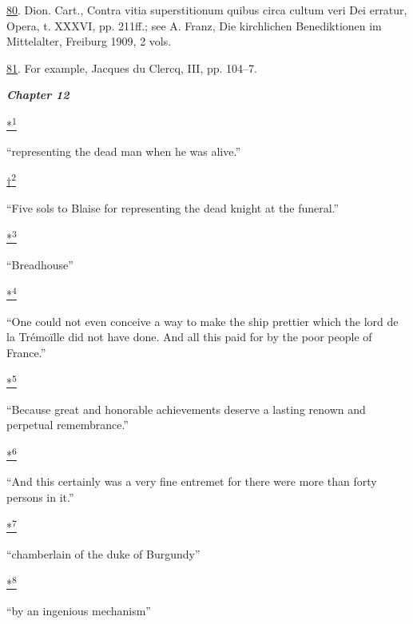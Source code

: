 \protect\hypertarget{23_NOTES.xhtmlux5cux23id_475}{\protect\hyperlink{18_Chapter_Eleven__THE_FORMS_OF_THO.xhtmlux5cux23id_474}{80}}.
Dion. Cart., Contra vitia superstitionum quibus circa cultum veri Dei
erratur, Opera, t. XXXVI, pp. 211ff.; see A. Franz, Die kirchlichen
Benediktionen im Mittelalter, Freiburg 1909, 2 vols.

\protect\hypertarget{23_NOTES.xhtmlux5cux23id_473}{\protect\hyperlink{18_Chapter_Eleven__THE_FORMS_OF_THO.xhtmlux5cux23id_472}{81}}.
For example, Jacques du Clercq, III, pp. 104--7.

\textbf{\emph{Chapter 12}}

\protect\hypertarget{23_NOTES.xhtmlux5cux23id_2656}{\protect\hyperlink{20_ILLUSTRATIONS_FOLLOW_PAGE.xhtmlux5cux23id_2655}{*\textsuperscript{1}}}
``representing the dead man when he was alive.''

\protect\hypertarget{23_NOTES.xhtmlux5cux23id_2658}{\protect\hyperlink{20_ILLUSTRATIONS_FOLLOW_PAGE.xhtmlux5cux23id_2657}{†\textsuperscript{2}}}
``Five sols to Blaise for representing the dead knight at the funeral.''

\protect\hypertarget{23_NOTES.xhtmlux5cux23id_2660}{\protect\hyperlink{20_ILLUSTRATIONS_FOLLOW_PAGE.xhtmlux5cux23id_2659}{*\textsuperscript{3}}}
``Breadhouse''

\protect\hypertarget{23_NOTES.xhtmlux5cux23id_2662}{\protect\hyperlink{20_ILLUSTRATIONS_FOLLOW_PAGE.xhtmlux5cux23id_2661}{*\textsuperscript{4}}}
``One could not even conceive a way to make the ship prettier which the
lord de la Trémoïlle did not have done. And all this paid for by the
poor people of France.''

\protect\hypertarget{23_NOTES.xhtmlux5cux23id_2664}{\protect\hyperlink{20_ILLUSTRATIONS_FOLLOW_PAGE.xhtmlux5cux23id_2663}{*\textsuperscript{5}}}
``Because great and honorable achievements deserve a lasting renown and
perpetual remembrance.''

\protect\hypertarget{23_NOTES.xhtmlux5cux23id_2666}{\protect\hyperlink{20_ILLUSTRATIONS_FOLLOW_PAGE.xhtmlux5cux23id_2665}{*\textsuperscript{6}}}
``And this certainly was a very fine entremet for there were more than
forty persons in it.''

\protect\hypertarget{23_NOTES.xhtmlux5cux23id_2668}{\protect\hyperlink{20_ILLUSTRATIONS_FOLLOW_PAGE.xhtmlux5cux23id_2667}{*\textsuperscript{7}}}
``chamberlain of the duke of Burgundy''

\protect\hypertarget{23_NOTES.xhtmlux5cux23id_2670}{\protect\hyperlink{20_ILLUSTRATIONS_FOLLOW_PAGE.xhtmlux5cux23id_2669}{*\textsuperscript{8}}}
``by an ingenious mechanism''

